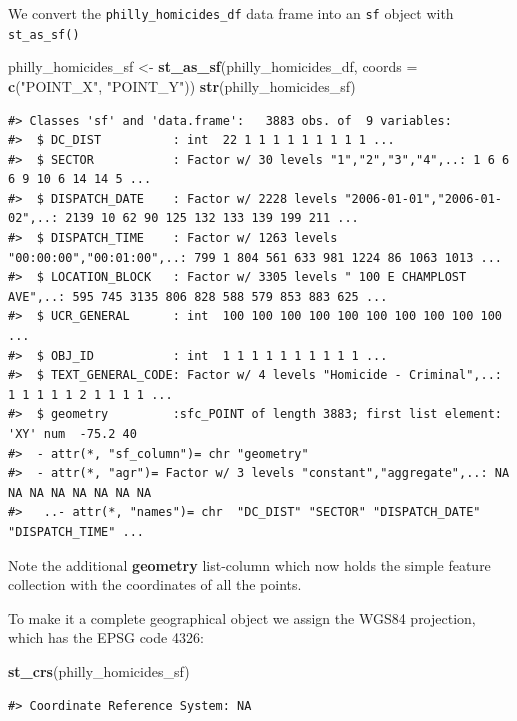 \documentclass[]{book}
\newenvironment{Shaded}{\begin{snugshade}}{\end{snugshade}}
\newcommand{\KeywordTok}[1]{\textcolor[rgb]{0.13,0.29,0.53}{\textbf{#1}}}
\newcommand{\DataTypeTok}[1]{\textcolor[rgb]{0.13,0.29,0.53}{#1}}
\newcommand{\StringTok}[1]{\textcolor[rgb]{0.31,0.60,0.02}{#1}}
\newcommand{\NormalTok}[1]{#1}
\begin{document}
We convert the \texttt{philly\_homicides\_df} data frame into an
\texttt{sf} object with \texttt{st\_as\_sf()}

\begin{Shaded}
\begin{Highlighting}[]
\NormalTok{philly_homicides_sf <-}\StringTok{ }\KeywordTok{st_as_sf}\NormalTok{(philly_homicides_df, }\DataTypeTok{coords =} \KeywordTok{c}\NormalTok{(}\StringTok{"POINT_X"}\NormalTok{, }\StringTok{"POINT_Y"}\NormalTok{))}
\KeywordTok{str}\NormalTok{(philly_homicides_sf)}
\end{Highlighting}
\end{Shaded}

\begin{verbatim}
#> Classes 'sf' and 'data.frame':   3883 obs. of  9 variables:
#>  $ DC_DIST          : int  22 1 1 1 1 1 1 1 1 1 ...
#>  $ SECTOR           : Factor w/ 30 levels "1","2","3","4",..: 1 6 6 6 9 10 6 14 14 5 ...
#>  $ DISPATCH_DATE    : Factor w/ 2228 levels "2006-01-01","2006-01-02",..: 2139 10 62 90 125 132 133 139 199 211 ...
#>  $ DISPATCH_TIME    : Factor w/ 1263 levels "00:00:00","00:01:00",..: 799 1 804 561 633 981 1224 86 1063 1013 ...
#>  $ LOCATION_BLOCK   : Factor w/ 3305 levels " 100 E CHAMPLOST AVE",..: 595 745 3135 806 828 588 579 853 883 625 ...
#>  $ UCR_GENERAL      : int  100 100 100 100 100 100 100 100 100 100 ...
#>  $ OBJ_ID           : int  1 1 1 1 1 1 1 1 1 1 ...
#>  $ TEXT_GENERAL_CODE: Factor w/ 4 levels "Homicide - Criminal",..: 1 1 1 1 1 2 1 1 1 1 ...
#>  $ geometry         :sfc_POINT of length 3883; first list element:  'XY' num  -75.2 40
#>  - attr(*, "sf_column")= chr "geometry"
#>  - attr(*, "agr")= Factor w/ 3 levels "constant","aggregate",..: NA NA NA NA NA NA NA NA
#>   ..- attr(*, "names")= chr  "DC_DIST" "SECTOR" "DISPATCH_DATE" "DISPATCH_TIME" ...
\end{verbatim}

Note the additional \textbf{geometry} list-column which now holds the
simple feature collection with the coordinates of all the points.

To make it a complete geographical object we assign the WGS84
projection, which has the EPSG code 4326:

\begin{Shaded}
\begin{Highlighting}[]
\KeywordTok{st_crs}\NormalTok{(philly_homicides_sf)}
\end{Highlighting}
\end{Shaded}

\begin{verbatim}
#> Coordinate Reference System: NA
\end{verbatim}
\end{document}
